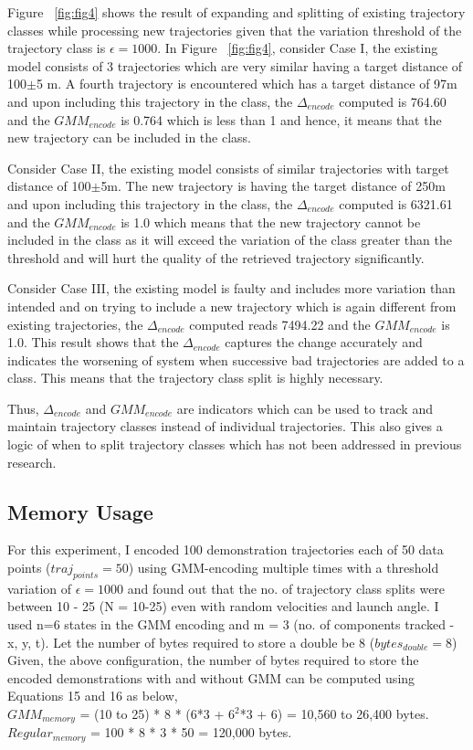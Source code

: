 \documentclass[conference]{IEEEtran}
\begin{document}
Figure ~\ref{fig:fig4} shows the result of expanding and splitting of existing trajectory classes while processing new trajectories given that the variation threshold of the trajectory class is $\epsilon=1000$. In Figure ~\ref{fig:fig4}, consider Case I, the existing model consists of 3 trajectories which are very similar having a target distance of 100$\pm$5 m. A fourth trajectory is encountered which has a target distance of 97m and upon including this trajectory in the class, the $\Delta_{encode}$ computed is 764.60 and the $GMM_{encode}$ is 0.764 which is less than 1 and hence, it means that the new trajectory can be included in the class.

Consider Case II, the existing model consists of similar trajectories with target distance of 100$\pm$5m. The new trajectory is having the target distance of 250m and upon including this trajectory in the class, the $\Delta_{encode}$ computed is 6321.61 and the $GMM_{encode}$ is 1.0 which means that the new trajectory cannot be included in the class as it will exceed the variation of the class greater than the threshold and will hurt the quality of the retrieved trajectory significantly.

Consider Case III, the existing model is faulty and includes more variation than intended and on trying to include a new trajectory which is again different from existing trajectories, the $\Delta_{encode}$ computed reads 7494.22 and the $GMM_{encode}$ is 1.0. This result shows that the $\Delta_{encode}$ captures the change accurately and indicates the worsening of system when successive bad trajectories are added to a class. This means that the trajectory class split is highly necessary. 

Thus, $\Delta_{encode}$ and $GMM_{encode}$ are indicators which can be used to track and maintain trajectory classes instead of individual trajectories. This also gives a logic of when to split trajectory classes which has not been addressed in previous research.

\subsection{Memory Usage}
For this experiment, I encoded 100 demonstration trajectories each of 50 data points ($traj_{points}=50$) using GMM-encoding multiple times with a threshold variation of $\epsilon = 1000$ and found out that the no. of trajectory class splits were between 10 - 25 (N = 10-25) even with random velocities and launch angle. I used n=6 states in the GMM encoding and m = 3 (no. of components tracked - x, y, t). Let the number of bytes required to store a double be 8 ($bytes_{double} = 8$) 
Given, the above configuration, the number of bytes required to store the encoded demonstrations with and without GMM can be computed using Equations 15 and 16 as below,\\
$GMM_{memory}$ = (10 to 25) * 8 * (6*3 + $6^{2}$*3 + 6) = 10,560 to 26,400 bytes.\\
$Regular_{memory}$ = 100 * 8 * 3 * 50 = 120,000 bytes.
\end{document}
